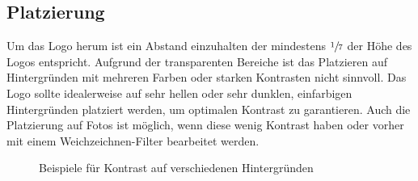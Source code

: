 \documentclass{article}
\begin{document}
\subsection{Platzierung}

Um das Logo herum ist ein Abstand einzuhalten der mindestens $\sfrac{1}{7}$ der Höhe des Logos entspricht. Aufgrund der transparenten Bereiche ist das Platzieren auf Hintergründen mit mehreren Farben oder starken Kontrasten nicht sinnvoll. Das Logo sollte idealerweise auf sehr hellen oder sehr dunklen, einfarbigen Hintergründen platziert werden, um optimalen Kontrast zu garantieren. Auch die Platzierung auf Fotos ist möglich, wenn diese wenig Kontrast haben oder vorher mit einem Weichzeichnen-Filter bearbeitet werden.

\begin{figure}[H]
\begin{centering}
\hfill
{}
\hfill

\hfill
{}
\hfill
\end{centering}
\caption{Beispiele für Kontrast auf verschiedenen Hintergründen}
\end{figure}
\end{document}

